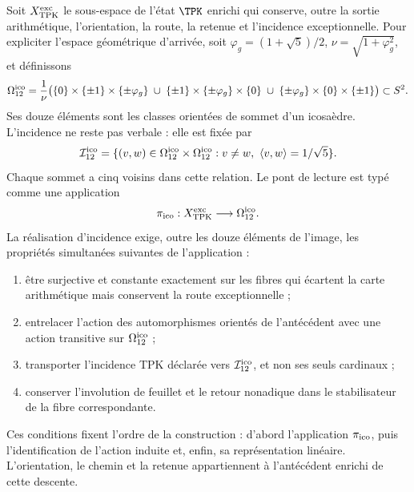 Soit \(X_{\rm TPK}^{\rm exc}\) le sous-espace de l’état \(\TPK\) enrichi
qui conserve, outre la sortie arithmétique, l’orientation, la route,
la retenue et l’incidence exceptionnelle. Pour expliciter l’espace géométrique d’arrivée,
soit \(\varphi_g=(1+\sqrt5)/2\), \(\nu=\sqrt{1+\varphi_g^2}\), et définissons
\begin{equation}
\label{ii:ii:pent:eq:gravity-icosahedron-vertices}
\Omega_{12}^{\rm ico}
=\frac1\nu\bigl(
\{0\}\times\{\pm1\}\times\{\pm\varphi_g\}
\;\cup\;
\{\pm1\}\times\{\pm\varphi_g\}\times\{0\}
\;\cup\;
\{\pm\varphi_g\}\times\{0\}\times\{\pm1\}
\bigr)\subset S^2.
\end{equation}
Ses douze éléments sont les classes orientées de sommet d’un icosaèdre.
L’incidence ne reste pas verbale : elle est fixée par
\begin{equation}
\label{ii:ii:pent:eq:gravity-icosahedron-incidence}
\mathcal I_{12}^{\rm ico}
=\{(v,w)\in\Omega_{12}^{\rm ico}\times\Omega_{12}^{\rm ico}:
v\neq w,\ \langle v,w\rangle=1/\sqrt5\}.
\end{equation}
Chaque sommet a cinq voisins dans cette relation. Le pont de lecture
est typé comme une application
\begin{equation}
\label{ii:ii:pent:eq:gravity-exceptional-reader-map}
\pi_{\rm ico}:X_{\rm TPK}^{\rm exc}\longrightarrow\Omega_{12}^{\rm ico}.
\end{equation}
La réalisation d’incidence exige, outre les douze éléments de
l’image, les propriétés simultanées suivantes de l’application :
\begin{enumerate}[label=(\roman*)]
\item être surjective et constante exactement sur les fibres qui écartent
la carte arithmétique mais conservent la route exceptionnelle ;
\item entrelacer l’action des automorphismes orientés de l’antécédent
avec une action transitive sur \(\Omega_{12}^{\rm ico}\) ;
\item transporter l’incidence TPK déclarée vers
\(\mathcal I_{12}^{\rm ico}\), et non
ses seuls cardinaux ;
\item conserver l’involution de feuillet et le retour nonadique dans le
stabilisateur de la fibre correspondante.
\end{enumerate}

Ces conditions fixent l’ordre de la construction : d’abord l’application
\(\pi_{\rm ico}\), puis l’identification de l’action induite et,
enfin, sa représentation linéaire. L’orientation, le chemin et la retenue
appartiennent à l’antécédent enrichi de cette descente.


